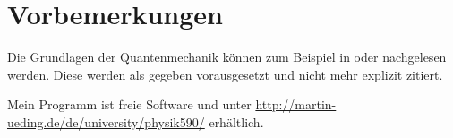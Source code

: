 
\chapter*{Vorbemerkungen}

Die Grundlagen der Quantenmechanik können zum Beispiel in
\parencite{Schwabl/Quantenmechanik} oder \parencite{nolting-theo5} nachgelesen
werden. Diese werden als gegeben vorausgesetzt und nicht mehr explizit zitiert.

Mein Programm ist freie Software und unter
\url{http://martin-ueding.de/de/university/physik590/} erhältlich.

